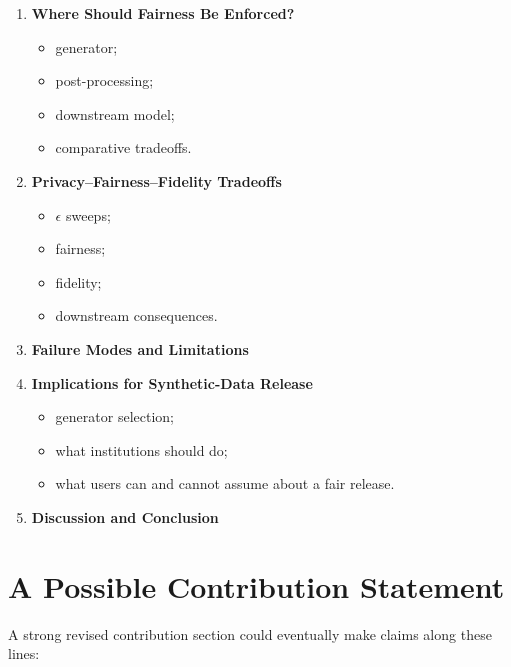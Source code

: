 \documentclass[11pt]{article}
\begin{document}
\begin{enumerate}
    \item \textbf{Where Should Fairness Be Enforced?}
    \begin{itemize}
        \item generator;
        \item post-processing;
        \item downstream model;
        \item comparative tradeoffs.
    \end{itemize}

    \item \textbf{Privacy--Fairness--Fidelity Tradeoffs}
    \begin{itemize}
        \item $\epsilon$ sweeps;
        \item fairness;
        \item fidelity;
        \item downstream consequences.
    \end{itemize}

    \item \textbf{Failure Modes and Limitations}

    \item \textbf{Implications for Synthetic-Data Release}
    \begin{itemize}
        \item generator selection;
        \item what institutions should do;
        \item what users can and cannot assume about a fair release.
    \end{itemize}

    \item \textbf{Discussion and Conclusion}
\end{enumerate}

\section*{A Possible Contribution Statement}

A strong revised contribution section could eventually make claims along these lines:
\end{document}
